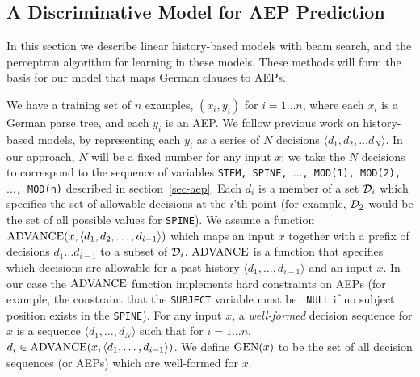 \documentclass[11pt]{report}
\theoremstyle{plain}
\begin{document}
{\subsection{A Discriminative Model for AEP Prediction}
\label{sec-model}
In this section we describe linear history-based models with beam
search, and the perceptron algorithm for learning in these
models. These methods will form the basis for our model that maps
German clauses to AEPs.

We have a training set of $n$ examples, $(x_i,y_i)$ for $i = 1 \ldots
n$, where each $x_i$ is a German parse tree, and each $y_i$ is an AEP.
We follow previous work on history-based models, by representing each
$y_i$ as a series of $N$ decisions $\langle d_1, d_2, \ldots d_N
\rangle$. In our approach, $N$ will be a fixed number for any input
$x$: we take the $N$ decisions to correspond to the sequence of
variables {\tt STEM, SPINE, $\ldots$, MOD(1), MOD(2), $\ldots$,
MOD(n)} described in section~\ref{sec-aep}.  Each $d_i$ is a member of
a set ${\cal D}_i$ which specifies the set of allowable decisions at
the $i$'th point (for example, ${\cal D}_2$ would be the set of all
possible values for {\tt SPINE}).  We assume a function
$\hbox{ADVANCE}(x, \langle d_1, d_2, \ldots, d_{i-1} \rangle)$ which
maps an input $x$ together with a prefix of decisions $d_1 \ldots
d_{i-1}$ to a subset of ${\cal D}_i$. $\hbox{ADVANCE}$ is a function
that specifies which decisions are allowable for a past history
$\langle d_1, \ldots, d_{i-1} \rangle$ and an input $x$. In our case
the $\hbox{ADVANCE}$ function implements hard constraints on AEPs (for
example, the constraint that the {\tt SUBJECT} variable must be {\tt
NULL} if no subject position exists in the {\tt SPINE}).  For any
input $x$, a {\em well-formed} decision sequence for $x$ is a sequence
$\langle d_1, \ldots, d_N \rangle$ such that for $i = 1 \ldots n$,
$d_i \in \hbox{ADVANCE}(x, \langle d_1, \ldots, d_{i-1} \rangle)$. We
define $\hbox{GEN}(x)$ to be the set of all decision sequences (or AEPs)
which are well-formed for $x$.

}
\end{document}
